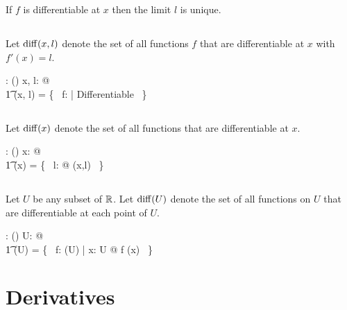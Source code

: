 \documentclass[11pt, oneside]{article}
\begin{document}
\begin{remark}
If $f$ is differentiable at $x$ then the limit $l$ is unique.
\end{remark}

\subsection{}

Let $\operatorname{diff}(x,l)$ denote the set of all functions $f$ that are differentiable at $x$ with $f'(x) = l$.

\begin{axdef}
	\diffRR: \R \cross \R \fun \power(\R \pfun \R)
\where
	\forall x, l: \R @ \\
	\t1	\diffRR(x, l) = \{~ f: \R \pfun \R | Differentiable ~\}
\end{axdef}

\subsection{}

Let $\operatorname{diff}(x)$ denote the set of all functions that are differentiable at $x$.

\begin{axdef}
	\diffR: \R \fun \power(\R \pfun \R)
\where
	\forall x: \R @ \\
	\t1	\diffR(x) = \bigcup \{~ l: \R @ \diffRR(x,l) ~\}
\end{axdef}

\subsection{}

Let $U$ be any subset of $\mathbb{R}$. 
Let $\operatorname{diff}(U)$ denote the set of all functions on $U$
that are differentiable at each point of $U$.

\begin{axdef}
	\diffPR: \power \R \fun \power(\R \pfun \R)
\where
	\forall U: \power \R @ \\
	\t1	\diffPR(U) = \{~ f: \CzeroPR(U) | \forall x: U @ f \in \diffR(x) ~\}
\end{axdef}

\section{Derivatives}

\subsection{}
\end{document}
